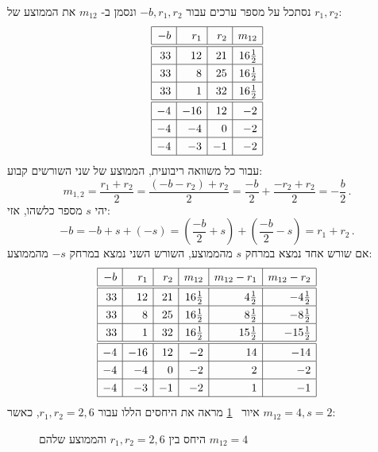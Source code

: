 נסתכל על מספר ערכים עבור
$-b,r_1,r_2$
ונסמן ב-%
$m_{12}$
את הממוצע של
$r_1,r_2$:
\[
\renewcommand{\arraystretch}{1.3}
\begin{array}{|r|r|r|r|}
\hline
-b& r_1 & r_2 &m_{12}\\\hline
\hline
33 & 12 & 21 & 16\frac{1}{2}\\\hline
33 & 8 & 25 & 16\frac{1}{2}\\\hline
33 & 1 & 32 & 16\frac{1}{2}\\\hline
\hline
-4 & -16 & 12 & -2 \\\hline
-4 & -4 & 0 & -2 \\\hline
-4 & -3 & -1 & -2 \\\hline
\end{array}
\]
עבור כל משוואה ריבועית, הממוצע של שני השורשים קבוע:
\[
m_{1,2}=\frac{r_1+r_2}{2}=
\frac{(-b-r_2)+r_2}{2}=
\frac{-b}{2}+\frac{-r_2+r_2}{2}=
-\frac{b}{2}\,.
\]
יהי 
$s$ 
מספר כלשהו, אזי:
\[
-b=-b+s+(-s)=\left(\frac{-b}{2}+s\right) + \left(\frac{-b}{2}-s\right)=r_1+r_2\,.
\]
אם שורש אחד נמצא במרחק
$s$
מהממוצע, השורש השני נמצא במרחק
$-s$
מהממוצע:
\[
\renewcommand{\arraystretch}{1.3}
\begin{array}{|r|r|r|r|r|r|}
\hline
-b& r_1 & r_2 & m_{12}& m_{12}-r_1 & m_{12}-r_2\\\hline\hline
33 & 12 & 21 & 16\frac{1}{2}&4\frac{1}{2} & -4\frac{1}{2}  \\\hline
33 & 8 & 25 & 16\frac{1}{2}&8\frac{1}{2}&-8\frac{1}{2}\\\hline
33 & 1 & 32 & 16\frac{1}{2}&15\frac{1}{2}&-15\frac{1}{2}\\\hline
\hline
-4 & -16 & 12 & -2 &14& -14\\\hline
-4 & -4 & 0 & -2&2&-2 \\\hline
-4 & -3 & -1 & -2&1&-1 \\\hline
\end{array}
\]
איור%
~\ref{f.loh-roots1}
מראה את היחסים הללו עבור
$r_1,r_2=2,6$,
כאשר
$m_{12}=4, s=2$:
\begin{figure}[t]
\begin{center}
\end{center}
\caption{היחס בין 
$r_1,r_2=2,6$
והממוצע שלהם
$m_{12}=4$}
\label{f.loh-roots1}
\end{figure}
